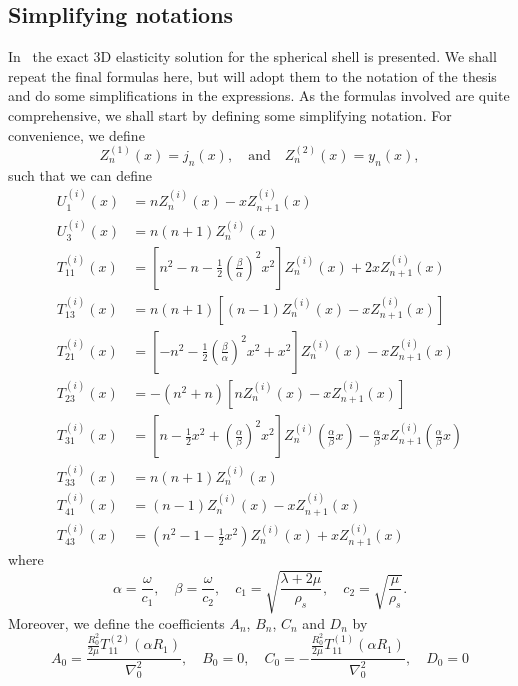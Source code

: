 \subsection{Simplifying notations}
In~\cite[pp. 12-20]{Chang1994voa} the exact 3D elasticity solution for the spherical shell is presented. We shall repeat the final formulas here, but will adopt them to the notation of the thesis and do some simplifications in the expressions. As the formulas involved are quite comprehensive, we shall start by defining some simplifying notation. For convenience, we define
\begin{equation*}
	Z_{n}^{(1)}(x) = j_n(x),\quad\text{and}\quad Z_{n}^{(2)}(x) = y_n(x),
\end{equation*}
such that we can define
\begin{align*}
	U_1^{(i)}(x) &= nZ_n^{(i)}(x)-xZ_{n+1}^{(i)}(x)\\
	U_3^{(i)}(x) &= n(n+1)Z_n^{(i)}(x)\\
	T_{11}^{(i)}(x) &= \left[n^2-n-\frac{1}{2}\left(\frac{\beta}{\alpha}\right)^2 x^2\right] Z_n^{(i)}(x) + 2xZ_{n+1}^{(i)}(x)\\
	T_{13}^{(i)}(x) &= n(n+1)\left[(n-1)Z_n^{(i)}(x) - xZ_{n+1}^{(i)}(x)\right]\\
	T_{21}^{(i)}(x) &= \left[-n^2-\frac{1}{2}\left(\frac{\beta}{\alpha}\right)^2 x^2+x^2\right] Z_n^{(i)}(x) - xZ_{n+1}^{(i)}(x)\\
	T_{23}^{(i)}(x) &= -(n^2+n)\left[n Z_n^{(i)}(x) - xZ_{n+1}^{(i)}(x)\right] \\
	T_{31}^{(i)}(x) &= \left[n-\frac{1}{2}x^2+\left(\frac{\alpha}{\beta}\right)^2 x^2\right] Z_n^{(i)}\left(\frac{\alpha}{\beta}x\right) - \frac{\alpha}{\beta}x Z_{n+1}^{(i)}\left(\frac{\alpha}{\beta}x\right)\\
	T_{33}^{(i)}(x) &= n(n+1)Z_n^{(i)}(x)\\
	T_{41}^{(i)}(x) &= (n-1) Z_n^{(i)}(x) - xZ_{n+1}^{(i)}(x)\\
	T_{43}^{(i)}(x) &= \left(n^2-1-\frac{1}{2}x^2\right) Z_n^{(i)}(x) + xZ_{n+1}^{(i)}(x)
\end{align*}
where
\begin{equation*}
	\alpha=\frac{\omega}{c_1},\quad \beta=\frac{\omega}{c_2},\quad c_1 = \sqrt{\frac{\lambda+2\mu}{\rho_s}},\quad c_2 = \sqrt{\frac{\mu}{\rho_s}}.
\end{equation*}
Moreover, we define the coefficients $A_n$, $B_n$, $C_n$ and $D_n$ by
\begin{equation*}
	A_0 = \frac{\frac{R_0^2}{2\mu}T_{11}^{(2)}(\alpha R_1)}{\nabla^2_0},\quad B_0=0,\quad
	C_0 = -\frac{\frac{R_0^2}{2\mu}T_{11}^{(1)}(\alpha R_1)}{\nabla^2_0},\quad D_0=0
\end{equation*}
